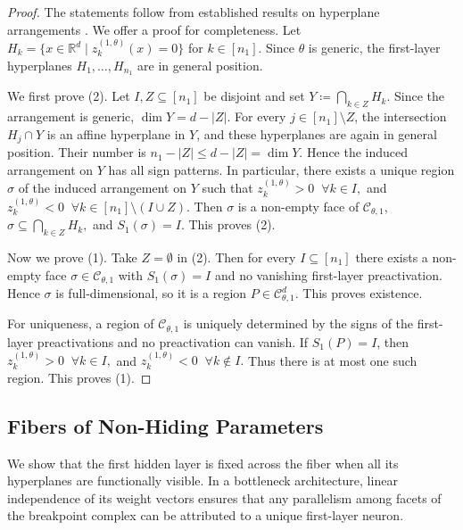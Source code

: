 \documentclass{article}
\theoremstyle{definition}
\newcommand{\R}{\mathbb{R}}
\newcommand{\complex}{\mathcal{C}}
\newcommand{\preactivation}[1]{z^{(#1)}}
\begin{document}
\begin{proof} 
The statements follow from established results on hyperplane arrangements \citep[see, e.g.,][Chapter~2]{Orlik1992}. 
We offer a proof for completeness. 
%
Let
$
H_k=\{x\in\R^d \mid \preactivation{1,\theta}_k(x)=0\}
$
for $k\in[n_1]$. Since $\theta$ is generic, the first-layer hyperplanes
$H_1,\dots,H_{n_1}$ are in general position.

We first prove (2). Let $I,Z\subseteq[n_1]$ be disjoint and set
$
Y \coloneqq \bigcap_{k\in Z} H_k.
$
Since the arrangement is generic,
$
\dim Y=d-|Z|.
$
For every $j\in[n_1]\setminus Z$, the intersection $H_j\cap Y$ is an affine
hyperplane in $Y$, and these hyperplanes are again in general position. Their
number is
$
n_1-|Z| \le d-|Z|=\dim Y.
$
Hence the induced arrangement on $Y$ has all sign patterns. In particular, there
exists a unique region $\sigma$ of the induced arrangement on $Y$ such that
$
\preactivation{1,\theta}_k>0 \;\; \forall k\in I,
$ and $
\preactivation{1,\theta}_k<0 \;\; \forall k\in [n_1]\setminus (I\cup Z).
$
Then $\sigma$ is a non-empty face of $\complex_{\theta,1}$,
$
\sigma \subseteq \bigcap_{k\in Z} H_k,
$
and
$
S_1(\sigma)=I.
$
This proves (2).

Now we prove (1). Take $Z=\emptyset$ in (2). Then for every $I\subseteq[n_1]$
there exists a non-empty face $\sigma\in\complex_{\theta,1}$ with
$
S_1(\sigma)=I
$
and no vanishing first-layer preactivation. Hence $\sigma$ is full-dimensional,
so it is a region
$
P\in\complex_{\theta,1}^d.
$
This proves existence.

For uniqueness, a region of $\complex_{\theta,1}$ is uniquely determined by the
signs of the first-layer preactivations and no preactivation can vanish. If $S_1(P)=I$, then
$
\preactivation{1,\theta}_k>0 \;\; \forall k\in I,
$ and $
\preactivation{1,\theta}_k<0 \;\; \forall k\notin I.
$
Thus there is at most one such region. This proves (1).
\end{proof}

\subsection{Fibers of Non-Hiding Parameters}
\label{app:fibers_non_hiding}
We show that the first hidden layer is fixed across the fiber when all its hyperplanes are functionally visible. In a bottleneck architecture, linear independence of its weight vectors ensures that any parallelism among facets of the breakpoint complex can be attributed to a unique first-layer neuron. 
\end{document}

